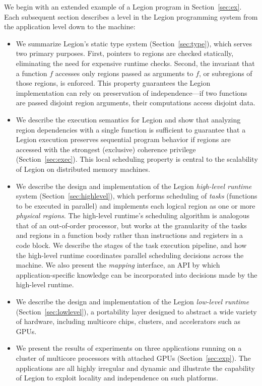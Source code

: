 \documentclass[9pt,nocopyrightspace]{sigplanconf}
\begin{document}
We begin with an extended example of a Legion program in Section~\ref{sec:ex}.
Each subsequent section describes a level in the Legion programming
system from the application level down to the machine:
 
\begin{itemize}

\item We summarize Legion's static type system (Section~\ref{sec:type}), which serves two primary
  purposes.  First, pointers to regions are checked
  statically, eliminating the need for expensive runtime checks.
  Second, the invariant that a function $f$ accesses only
  regions passed as arguments to $f$, or subregions of those regions, is enforced.
  This property guarantees the Legion implementation can rely on
  preservation of independence---if two functions are passed disjoint
  region arguments, their computations access disjoint
data.  

\item We describe the execution semantics for Legion and show that
analyzing region dependencies with a single function is sufficient to 
guarantee that a Legion execution preserves sequential program
behavior if regions are accessed with the strongest (exclusive)
coherence privilege (Section~\ref{sec:exec}).  This local scheduling property is central to 
the scalability of Legion on distributed memory machines.

\item We describe the design and implementation of the Legion {\em high-level runtime}
system (Section~\ref{sec:highlevel}), which performs scheduling of {\em tasks} (functions to be executed in parallel)
and implements each logical region as one or more {\em physical regions}.
The high-level runtime's scheduling algorithm is analogous that of an out-of-order processor,
but works at the granularity of the tasks and regions in a function body rather than instructions and registers
in a code block.  We describe the stages of the task execution pipeline, and how the high-level runtime coordinates parallel
scheduling decisions across the machine.  We also present the {\em mapping} interface, an API by which
application-specific knowledge can be incorporated into decisions made by the high-level runtime.

\item We describe the design and implementation of the Legion {\em low-level runtime} (Section~\ref{sec:lowlevel}),
a portability layer designed to abstract a wide variety of hardware, including multicore chips, clusters, and accelerators
such as GPUs. 

\item We present the results of experiments on three applications running on a cluster of multicore processors with
attached GPUs (Section~\ref{sec:exp}).  The applications are all highly irregular and dynamic and illustrate the capability of Legion to 
exploit locality and independence on such platforms.

\end{itemize}
















{
\small

}
\end{document}
